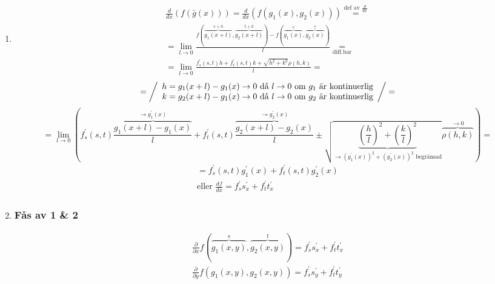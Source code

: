 \documentclass{article}
\begin{document}
\begin{enumerate}
	\newpage
	\item
	\[
	\begin{split}
		\frac{d}{dx}(f(\bar{g}(x))) = \frac{d}{dx}(f(g_{1}(x),g_{2}(x))) \overset{\text{def av }\frac{d}{dx}}{=} \\
		= \lim_{l \rightarrow 0} \frac{f(\overbrace{g_{1}(x+l)}^{s+h},\overbrace{g_{2}(x+l)}^{t+k}) - 
		f(\overbrace{g_{1}(x)}^{s},\overbrace{g_{2}(x)}^{t})}{l} \underset{\text{diff.bar}}{=} \\
		= \lim_{l \rightarrow 0} \frac{f_{s}^{\prime}(s,t)h+f_{t}^{\prime}(s,t)k+\sqrt{h^2+k^2}\rho(h,k)}{l} = 
	\end{split}
	\]
	\[
		= \left/ \begin{array}{rcl}
			h=g_{1}(x+l)-g_{1}(x) \rightarrow 0 \text{ då } l \rightarrow 0 \text{ om \(g_{1}\) är kontinuerlig} \\
			k=g_{2}(x+l)-g_{1}(x) \rightarrow 0 \text{ då } l \rightarrow 0 \text{ om \(g_{2}\) är kontinuerlig}
		\end{array}\right/ =
	\]
	\[
		= \lim_{l \rightarrow 0} \left(
		 f_{s}^{\prime}(s,t)\overbrace{\frac{g_{1}(x+l)-g_{1}(x)}{l}}^{\rightarrow g_{1}^{\prime}(x)}+
		 f_{t}^{\prime}(s,t)\overbrace{\frac{g_{2}(x+l)-g_{2}(x)}{l}}^{\rightarrow g_{2}^{\prime}(x)}\pm
		 \sqrt{\underbrace{\left(\frac{h}{l}\right)^2+\left(\frac{k}{l}\right)^2}
		 _{\rightarrow (g_{1}^{\prime}(x))^2+(g_{2}^{\prime}(x))^2 \text{ begränsad}}}
		 \overbrace{\rho(h,k)}^{\rightarrow 0} 
		\right) =
	\]
	\[
	\begin{split}
		= f_{s}^{\prime}(s,t)g_{1}^{\prime}(x) + f_{t}^{\prime}(s,t)g_{2}^{\prime}(x) \\
		\text{eller } \frac{df}{dx} = f_{s}^{\prime}s_{x}^{\prime} + f_{t}^{\prime}t_{x}^{\prime}
	\end{split}
	\]
	\item \subsubsection*{Fås av 1 \& 2}
	\[
	\begin{split}
		\frac{\partial}{\partial x}f(\overbrace{g_{1}(x,y)}^{s},\overbrace{g_{2}(x,y)}^{t}) = f_{s}^{\prime}s_{x}^{\prime} +
		f_{t}^{\prime}t_{x}^{\prime} \\
		\frac{\partial}{\partial y}f(g_{1}(x,y),g_{2}(x,y)) = f_{s}^{\prime}s_{y}^{\prime} + f_{t}^{\prime}t_{y}^{\prime}
	\end{split}
	\]

\end{enumerate}
\end{document}
